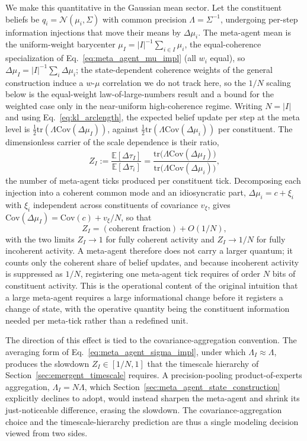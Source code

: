 \documentclass[11pt]{article}
\begin{document}
We make this quantitative in the Gaussian mean sector. Let the constituent beliefs be $q_i = \mathcal{N}(\mu_i, \Sigma)$ with common precision $\Lambda = \Sigma^{-1}$, undergoing per-step information injections that move their means by $\Delta\mu_i$. The meta-agent mean is the uniform-weight barycenter $\mu_I = |I|^{-1}\sum_{i\in I}\mu_i$, the equal-coherence specialization of Eq.~\eqref{eq:meta_agent_mu_impl} (all $w_i$ equal), so $\Delta\mu_I = |I|^{-1}\sum_i \Delta\mu_i$; the state-dependent coherence weights of the general construction induce a $w$-$\mu$ correlation we do not track here, so the $1/N$ scaling below is the equal-weight law-of-large-numbers result and a bound for the weighted case only in the near-uniform high-coherence regime. Writing $N = |I|$ and using Eq.~\eqref{eq:kl_arclength}, the expected belief update per step at the meta level is $\tfrac{1}{2}\mathrm{tr}(\Lambda\mathrm{Cov}(\Delta\mu_I))$, against $\tfrac{1}{2}\mathrm{tr}(\Lambda\mathrm{Cov}(\Delta\mu_i))$ per constituent. The dimensionless carrier of the scale dependence is their ratio,
\begin{equation}
Z_I := \frac{\mathbb{E}[\Delta\tau_I]}{\mathbb{E}[\Delta\tau_i]} = \frac{\mathrm{tr}\big(\Lambda\mathrm{Cov}(\Delta\mu_I)\big)}{\mathrm{tr}\big(\Lambda\mathrm{Cov}(\Delta\mu_i)\big)},
\label{eq:bit_production_ratio}
\end{equation}
the number of meta-agent ticks produced per constituent tick. Decomposing each injection into a coherent common mode and an idiosyncratic part, $\Delta\mu_i = c + \xi_i$ with $\xi_i$ independent across constituents of covariance $v_\xi$, gives $\mathrm{Cov}(\Delta\mu_I) = \mathrm{Cov}(c) + v_\xi/N$, so that
\begin{equation}
Z_I = (\text{coherent fraction}) + O(1/N),
\label{eq:Z_decomposition}
\end{equation}
with the two limits $Z_I \to 1$ for fully coherent activity and $Z_I \to 1/N$ for fully incoherent activity. A meta-agent therefore does not carry a larger quantum; it counts only the coherent share of belief updates, and because incoherent activity is suppressed as $1/N$, registering one meta-agent tick requires of order $N$ bits of constituent activity. This is the operational content of the original intuition that a large meta-agent requires a large informational change before it registers a change of state, with the operative quantity being the constituent information needed per meta-tick rather than a redefined unit.

The direction of this effect is tied to the covariance-aggregation convention. The averaging form of Eq.~\eqref{eq:meta_agent_sigma_impl}, under which $\Lambda_I \approx \Lambda$, produces the slowdown $Z_I \in [1/N, 1]$ that the timescale hierarchy of Section~\ref{sec:emergent_timescale} requires. A precision-pooling product-of-experts aggregation, $\Lambda_I = N\Lambda$, which Section~\ref{sec:meta_agent_state_construction} explicitly declines to adopt, would instead sharpen the meta-agent and shrink its just-noticeable difference, erasing the slowdown. The covariance-aggregation choice and the timescale-hierarchy prediction are thus a single modeling decision viewed from two sides.
\end{document}
